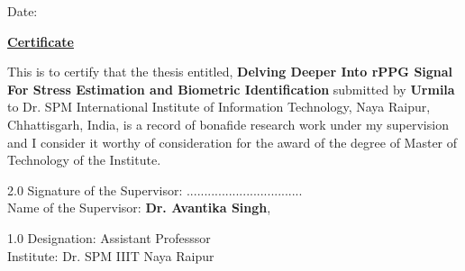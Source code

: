 \thispagestyle{empty}




\vspace*{2.5cm}
\begin{flushright}
Date: \\
\end{flushright}
\baselineskip
\centerline{\underline{\Large{\bf Certificate}}}
\baselineskip
\noindent


This is to certify that the thesis entitled, \textbf{Delving Deeper Into rPPG Signal For Stress Estimation and Biometric Identification} submitted by \textbf{Urmila} to Dr. SPM International Institute of Information Technology, Naya Raipur, Chhattisgarh, India, is a record of bonafide research work under my supervision and I consider it worthy of consideration for the award of the degree of Master of Technology of the Institute.


\vspace*{1.5cm}
\begin{flushleft}
\begin{spacing}{2.0}
Signature of the Supervisor: ................................. \\
Name of the Supervisor: {\bf Dr. Avantika Singh},\\
\end{spacing}
\begin{spacing}{1.0}
Designation: Assistant Professsor\\
Institute: Dr. SPM IIIT Naya Raipur
\end{spacing}
\end{flushleft}





